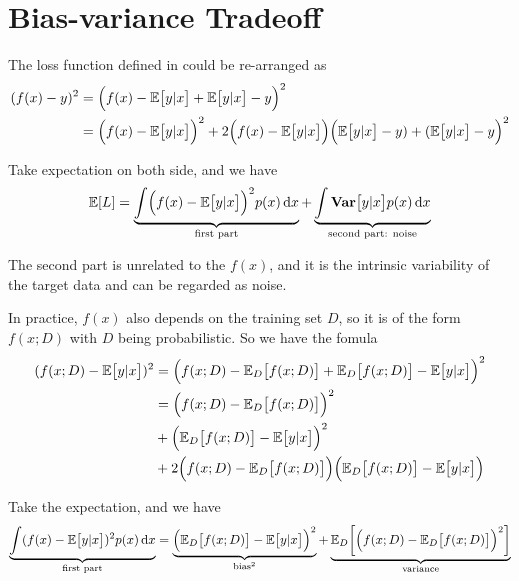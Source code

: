 \section{Bias-variance Tradeoff}

The loss function defined in  could be re-arranged as
\begin{equation}
    \begin{aligned}
        (f(x) - y)^2 &= \mleft(f(x) - \expectation{y|x} + \expectation{y|x} - y\mright)^2 \\
        &= \mleft(f(x) - \expectation{y|x}\mright)^2 + 2 \mleft(f(x) - \expectation{y|x}\mright)\mleft(\expectation{y|x} - y) + (\expectation{y|x} - y\mright)^2
    \end{aligned}
\end{equation}

Take expectation on both side, and we have
\begin{equation}
    \expectation{L} = \underbrace{\int \mleft(f(x) - \expectation{y|x}\mright)^2 p(x) \dif x}_{\text{first part}} + \underbrace{\int \variance{y|x} p(x) \dif x}_{\text{second part: noise}}
\end{equation}

The second part is unrelated to the $f(x)$, and it is the intrinsic variability of the target data and can be regarded as noise. 

In practice, $f(x)$ also depends on the training set $D$, so it is of the form $f(x;D)$ with $D$ being probabilistic. So we have the fomula
\begin{equation}
    \begin{aligned}
        (f(x;D) - \expectation{y|x})^2 &= \mleft(f(x;D) - \expectationonanvariable{D}{f(x;D)} + \expectationonanvariable{D}{f(x;D)} - \expectation{y|x}\mright)^2 \\
        &= \mleft(f(x;D) - \expectationonanvariable{D}{f(x;D)}\mright)^2 \\
        &+ \mleft(\expectationonanvariable{D}{f(x;D)} - \expectation{y|x}\mright)^2 \\
        &+ 2 \mleft(f(x;D) - \expectationonanvariable{D}{f(x;D)}\mright)\mleft(\expectationonanvariable{D}{f(x;D)} - \expectation{y|x}\mright)
    \end{aligned}
\end{equation}

Take the expectation, and we have
\begin{equation}
    \underbrace{\int (f(x) - \expectation{y|x})^2 p(x) \dif x}_{\text{first part}} = \underbrace{\mleft(\expectationonanvariable{D}{f(x;D)} - \expectation{y|x}\mright)^2}_{\text{bias}^2} + \underbrace{\expectationonanvariable{D}{\mleft(f(x;D) - \expectationonanvariable{D}{f(x;D)}\mright)^2}}_{\text{variance}}
\end{equation}

